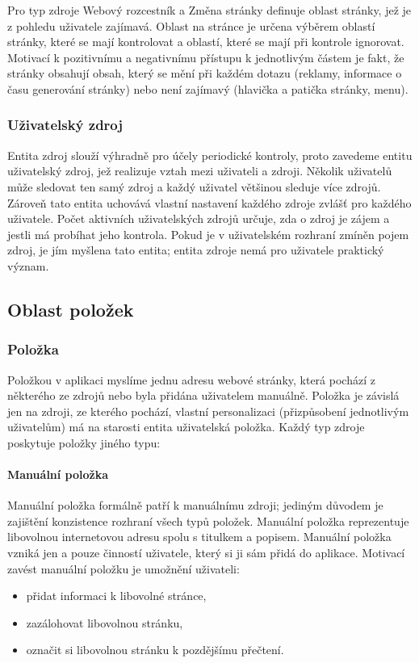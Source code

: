Pro typ zdroje Webový rozcestník a Změna stránky definuje oblast stránky, jež je z pohledu uživatele zajímavá.
Oblast na stránce je určena výběrem oblastí stránky, které se mají kontrolovat a oblastí, které se mají při kontrole ignorovat.
Motivací k pozitivnímu a negativnímu přístupu k jednotlivým částem je fakt, že stránky obsahují obsah, který se mění při každém dotazu (reklamy, informace o času generování stránky) nebo není zajímavý (hlavička a patička stránky, menu).

\subsubsection{Uživatelský zdroj}

Entita zdroj slouží výhradně pro účely periodické kontroly, proto zavedeme entitu uživatelský zdroj, jež realizuje vztah mezi uživateli a zdroji.
Několik uživatelů může sledovat ten samý zdroj a každý uživatel většinou sleduje více zdrojů.
Zároveň tato entita uchovává vlastní nastavení každého zdroje zvlášť pro každého uživatele.
Počet aktivních uživatelských zdrojů určuje, zda o zdroj je zájem a jestli má probíhat jeho kontrola.
Pokud je v uživatelském rozhraní zmíněn pojem zdroj, je jím myšlena tato entita; entita zdroje nemá pro uživatele praktický význam.

\subsection{Oblast položek}

\subsubsection{Položka}

Položkou v aplikaci myslíme jednu adresu webové stránky, která pochází z některého ze zdrojů nebo byla přidána uživatelem manuálně.
Položka je závislá jen na zdroji, ze kterého pochází, vlastní personalizaci (přizpůsobení jednotlivým uživatelům) má na starosti entita uživatelská položka.
Každý typ zdroje poskytuje položky jiného typu:

\paragraph{Manuální položka}

Manuální položka formálně patří k manuálnímu zdroji; jediným důvodem je zajištění konzistence rozhraní všech typů položek.
Manuální položka reprezentuje libovolnou internetovou adresu spolu s titulkem a popisem.
Manuální položka vzniká jen a pouze činností uživatele, který si ji sám přidá do aplikace.
Motivací zavést manuální položku je umožnění uživateli:
\begin{itemize}
	\item přidat informaci k libovolné stránce,
	\item zazálohovat libovolnou stránku,
	\item označit si libovolnou stránku k pozdějšímu přečtení.
\end{itemize}

